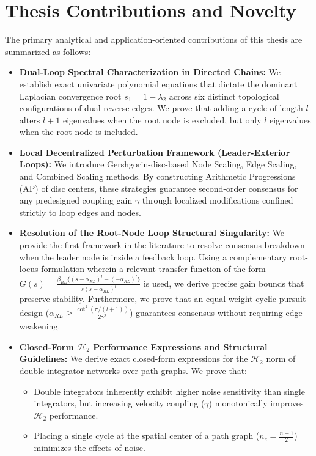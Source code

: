 \section{Thesis Contributions and Novelty}
The primary analytical and application-oriented contributions of this thesis are summarized as follows:
\begin{itemize}
    \item \textbf{Dual-Loop Spectral Characterization in Directed Chains:} We establish exact univariate polynomial equations that dictate the dominant Laplacian convergence root $s_1 = 1 - \lambda_2$ across six distinct topological configurations of dual reverse edges. We prove that adding a cycle of length $l$ alters $l+1$ eigenvalues when the root node is excluded, but only $l$ eigenvalues when the root node is included.
    \item \textbf{Local Decentralized Perturbation Framework (Leader-Exterior Loops):} We introduce Gershgorin-disc-based Node Scaling, Edge Scaling, and Combined Scaling methods. By constructing Arithmetic Progressions (AP) of disc centers, these strategies guarantee second-order consensus for any predesigned coupling gain $\gamma$ through localized modifications confined strictly to loop edges and nodes.
    \item \textbf{Resolution of the Root-Node Loop Structural Singularity:} We provide the first framework in the literature to resolve consensus breakdown when the leader node is inside a feedback loop. Using a complementary root-locus formulation wherein a relevant transfer function of the form $G(s) = \frac{\beta_{RL}\{(s-\alpha_{RL})^l - (-\alpha_{RL})^l\}}{s(s-\alpha_{RL})^l}$ is used, we derive precise gain bounds that preserve stability. Furthermore, we prove that an equal-weight cyclic pursuit design ($\alpha_{RL} \ge \frac{\cot^2(\pi/(l+1))}{2\gamma^2}$) guarantees consensus without requiring edge weakening.
    \item \textbf{Closed-Form $\mathcal{H}_2$ Performance Expressions and Structural Guidelines:} We derive exact closed-form expressions for the $\mathcal{H}_2$ norm of double-integrator networks over path graphs. We prove that: 
        \begin{itemize}
            \item Double integrators inherently exhibit higher noise sensitivity than single integrators, but increasing velocity coupling ($\gamma$) monotonically improves $\mathcal{H}_2$ performance.
            \item Placing a single cycle at the spatial center of a path graph ($n_c = \frac{n+1}{2}$) minimizes the effects of noise.

\end{itemize}
\end{itemize}
